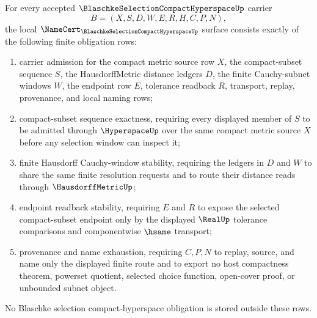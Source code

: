 \begin{theorem}
\label{thm:blaschke-selection-compact-hyperspace-namecert-obligations}
For every accepted $\BlaschkeSelectionCompactHyperspaceUp$ carrier
$$
B=(X,S,D,W,E,R,H,C,P,N),
$$
the local $\NameCert_{\BlaschkeSelectionCompactHyperspaceUp}$ surface consists exactly of the following finite obligation rows:
\begin{enumerate}
\item carrier admission for the compact metric source row $X$, the compact-subset sequence $S$, the HausdorffMetric distance ledgers $D$, the finite Cauchy-subnet windows $W$, the endpoint row $E$, tolerance readback $R$, transport, replay, provenance, and local naming rows;
\item compact-subset sequence exactness, requiring every displayed member of $S$ to be admitted through $\HyperspaceUp$ over the same compact metric source $X$ before any selection window can inspect it;
\item finite Hausdorff Cauchy-window stability, requiring the ledgers in $D$ and $W$ to share the same finite resolution requests and to route their distance reads through $\HausdorffMetricUp$;
\item endpoint readback stability, requiring $E$ and $R$ to expose the selected compact-subset endpoint only by the displayed $\RealUp$ tolerance comparisons and componentwise $\hsame$ transport;
\item provenance and name exhaustion, requiring $C,P,N$ to replay, source, and name only the displayed finite route and to export no host compactness theorem, powerset quotient, selected choice function, open-cover proof, or unbounded subnet object.
\end{enumerate}
No Blaschke selection compact-hyperspace obligation is stored outside these rows.
\end{theorem}
